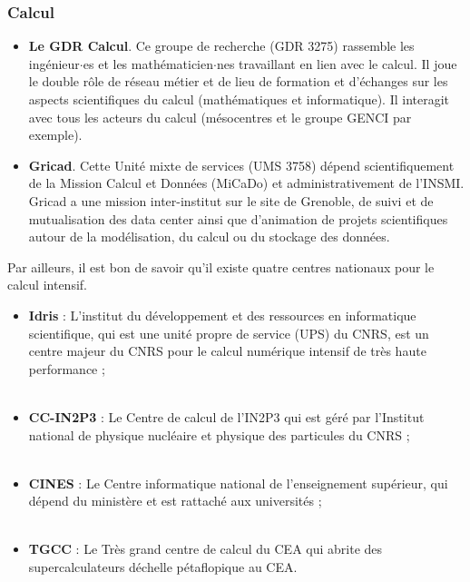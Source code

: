 \subsubsection{Calcul}

\begin{itemize}
\item {\bf Le GDR Calcul}. Ce groupe de recherche (GDR 3275) rassemble les ing\'enieur$\cdot$es et les math\'ematicien$\cdot$nes travaillant en lien avec le calcul. Il joue le double r\^ole de r\'eseau m\'etier et de lieu de formation et d'\'echanges sur les aspects scientifiques du calcul (math\'ematiques et informatique). Il interagit avec tous les acteurs du calcul (m\'esocentres et le groupe GENCI par exemple).\\
\item{\bf Gricad}. Cette Unit\'e mixte de services (UMS  3758) d\'epend scientifiquement de la Mission Calcul et Donn\'ees (MiCaDo) et administrativement de l'INSMI. Gricad a une mission inter-institut sur le site de Grenoble, de suivi et de mutualisation des data center ainsi que d'animation de projets scientifiques autour de la mod\'elisation, du calcul ou du stockage des donn\'ees.\\
\end{itemize}
Par ailleurs, il est bon de savoir qu'il existe quatre centres nationaux pour le calcul intensif.
\begin{itemize}
\item {\bf Idris} :
L'institut du d\'eveloppement et des ressources en informatique
scientifique, qui est une unit\'e propre de service (UPS) du
CNRS, est un centre majeur du CNRS pour le calcul num\'erique intensif
de tr\`es haute performance ; \\
\\
\item {\bf CC-IN2P3} : Le Centre de calcul de l'IN2P3 qui est g\'er\'e par l'Institut national de physique nucl\'eaire et physique des particules du CNRS ; \\
\\
\item {\bf CINES} : Le Centre informatique national de l'enseignement sup\'erieur,
qui d\'epend du minist\`ere et est rattach\'e aux universit\'es ;\\
\\
\item {\bf TGCC} : Le Tr\`es  grand centre de calcul du CEA  qui abrite des supercalculateurs d\'echelle p\'etaflopique au CEA. \\
\end{itemize}

